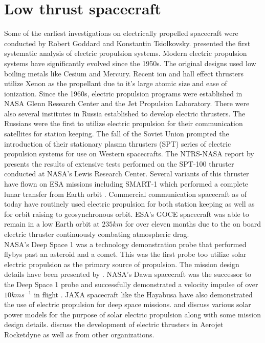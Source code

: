\section{Low thrust spacecraft}
Some of the earliest investigations on electrically propelled spacecraft were conducted by Robert Goddard and Konstantin Tsiolkovsky. \cite{stuhlinger_ion_1964} presented the first systematic analysis of electric propulsion systems. Modern electric propulsion systems have significantly evolved since the 1950s. The original designs used low boiling metals like Cesium and Mercury. Recent ion and hall effect thrusters utilize Xenon as the propellant due to it's large atomic size and ease of ionization. Since the 1960s, electric propulsion programs were established in NASA Glenn Research Center and the Jet Propulsion Laboratory. There were also several institutes in Russia established to develop electric thrusters. The Russians were the first to utilize electric propulsion for their communication satellites for station keeping. The fall of the Soviet Union prompted the introduction of their stationary plasma thrusters (SPT) series of electric propulsion systems for use on Western spacecrafts. The NTRS-NASA report by \cite{sankovic_performance_1994} presents the results of extensive tests performed on the SPT-100 thruster conducted at NASA's Lewis Research Center. Several variants of this thruster have flown on ESA missions including SMART-1 which performed a complete lunar transfer from Earth orbit \citep{kugelberg_accommodating_2004}. Commercial communication spacecraft as of today have routinely used electric propulsion for both station keeping as well as for orbit raising to geosynchronous orbit. ESA's GOCE spacecraft was able to remain in a low Earth orbit at $235km$ for over eleven months due to the on board electric thruster continuously combating atmospheric drag.\\
NASA's Deep Space 1 was a technology demonstration probe that performed flybys past an asteroid and a comet. This was the first probe too utilize solar electric propulsion as the primary source of propulsion. The mission design details have been presented by \cite{rayman_mission_1999}. NASA's Dawn spacecraft was the successor to the Deep Space 1 probe and successfully demonstrated a velocity impulse of over $10kms^{-1}$ in flight \citep{rayman_dawn_2006}. JAXA spacecraft like the Hayabusa have also demonstrated the use of electric propulsion for deep space missions. \cite{williams_benefits_1997} and \cite{circi_mars_2004} discuss various solar power models for the purpose of solar electric propulsion along with some mission design details. \cite{hoskins_30_2013} discuss the development of electric thrusters in Aerojet Rocketdyne as well as from other organizations.
